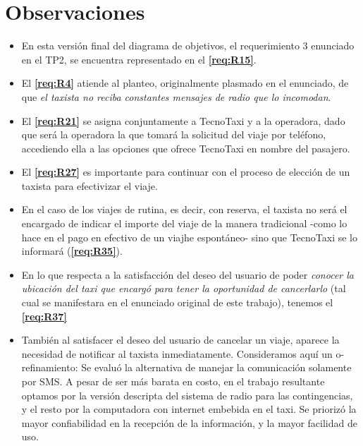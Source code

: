 \section{Observaciones}
\begin{itemize}

\item En esta versión final del diagrama de objetivos, el requerimiento 3 enunciado en el TP2, se encuentra representado en el \textbf{\ref{req:R15}}.
\item El \textbf{\ref{req:R4}} atiende al planteo, originalmente plasmado en el enunciado, de que \emph{el taxista no reciba constantes mensajes de radio que lo incomodan}.
\item El \textbf{\ref{req:R21}} se asigna conjuntamente a TecnoTaxi y a la operadora, dado que será la operadora la que tomará la solicitud del viaje por teléfono, accediendo ella a las opciones que ofrece TecnoTaxi en nombre del pasajero.
\item El \textbf{\ref{req:R27}} es importante para continuar con el proceso de elección de un taxista para efectivizar el viaje. 
\item En el caso de los viajes de rutina, es decir, con reserva, el taxista no será el encargado de indicar el importe del viaje de la manera tradicional -como lo hace en el pago en efectivo de un viajhe espontáneo- sino que TecnoTaxi se lo informará (\textbf{\ref{req:R35}}).
\item En lo que respecta a la satisfacción del deseo del usuario de poder \emph{conocer la ubicación del taxi que encargó para tener la oportunidad de cancerlarlo }(tal cual se manifestara en el enunciado original de este trabajo), tenemos el \textbf{\ref{req:R37}}
\item También al satisfacer el deseo del usuario de cancelar un viaje, aparece la necesidad de notificar al taxista inmediatamente. Consideramos aquí un o-refinamiento: Se evaluó la alternativa de manejar la comunicación solamente por SMS. A pesar de ser más barata en costo, en el trabajo resultante optamos por la versión descripta del sistema de radio para las contingencias, y el resto por la computadora con internet embebida en el taxi. Se priorizó la mayor confiabilidad en la recepción de la información, y la mayor facilidad de uso.

\end{itemize}
